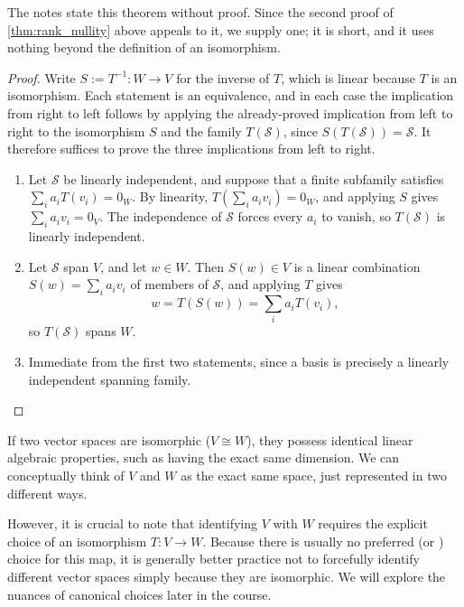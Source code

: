 The notes state this theorem without proof. Since the second proof of
\cref{thm:rank_nullity} above appeals to it, we supply one; it is short, and it
uses nothing beyond the definition of an isomorphism.

\begin{proof}
Write $S := T^{-1}: W \to V$ for the inverse of $T$, which is linear because $T$ is an isomorphism. Each statement is an equivalence, and in each case the implication from right to left follows by applying the already-proved implication from left to right to the isomorphism $S$ and the family $T(\mathcal{S})$, since $S(T(\mathcal{S})) = \mathcal{S}$. It therefore suffices to prove the three implications from left to right.

\begin{enumerate}
    \item Let $\mathcal{S}$ be linearly independent, and suppose that a finite subfamily satisfies $\sum_{i} a_i T(v_i) = 0_W$. By linearity, $T\left( \sum_{i} a_i v_i \right) = 0_W$, and applying $S$ gives $\sum_{i} a_i v_i = 0_V$. The independence of $\mathcal{S}$ forces every $a_i$ to vanish, so $T(\mathcal{S})$ is linearly independent.
    \item Let $\mathcal{S}$ span $V$, and let $w \in W$. Then $S(w) \in V$ is a linear combination $S(w) = \sum_{i} a_i v_i$ of members of $\mathcal{S}$, and applying $T$ gives
    \[
    w = T(S(w)) = \sum_{i} a_i T(v_i),
    \]
    so $T(\mathcal{S})$ spans $W$.
    \item Immediate from the first two statements, since a basis is precisely a linearly independent spanning family. \qedhere
\end{enumerate}
\end{proof}

\begin{remark}
\label{rem:significance_of_iso}
If two vector spaces are isomorphic ($V \cong W$), they possess identical linear algebraic properties, such as having the exact same dimension. We can conceptually think of $V$ and $W$ as the exact same space, just represented in two different ways. 

However, it is crucial to note that identifying $V$ with $W$ requires the explicit choice of an isomorphism $T: V \to W$. Because there is usually no preferred (or ) choice for this map, it is generally better practice not to forcefully identify different vector spaces simply because they are isomorphic. We will explore the nuances of canonical choices later in the course.
\end{remark}

